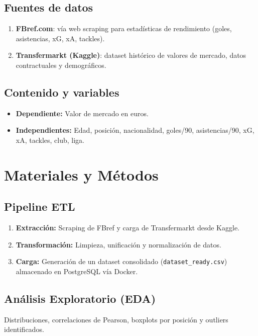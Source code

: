 \documentclass[12pt,letterpaper]{article}
\begin{document}
\subsection{Fuentes de datos}
\begin{enumerate}
    \item \textbf{FBref.com}: vía web scraping para estadísticas de rendimiento (goles, asistencias, xG, xA, tackles).
    \item \textbf{Transfermarkt (Kaggle)}: dataset histórico de valores de mercado, datos contractuales y demográficos.
\end{enumerate}

\subsection{Contenido y variables}
\begin{itemize}
    \item \textbf{Dependiente:} Valor de mercado en euros.
    \item \textbf{Independientes:} Edad, posición, nacionalidad, goles/90, asistencias/90, xG, xA, tackles, club, liga.
\end{itemize}

\section{Materiales y Métodos}
\subsection{Pipeline ETL}
\begin{enumerate}
    \item \textbf{Extracción:} Scraping de FBref y carga de Transfermarkt desde Kaggle.
    \item \textbf{Transformación:} Limpieza, unificación y normalización de datos.
    \item \textbf{Carga:} Generación de un dataset consolidado (\texttt{dataset\_ready.csv}) almacenado en PostgreSQL vía Docker.
\end{enumerate}

\subsection{Análisis Exploratorio (EDA)}
Distribuciones, correlaciones de Pearson, boxplots por posición y outliers identificados.
\end{document}
